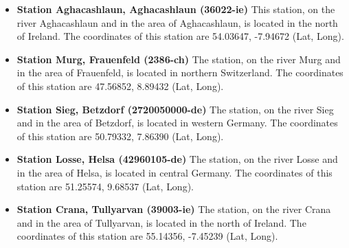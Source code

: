\begin{itemize}
    \item \textbf{Station Aghacashlaun, Aghacashlaun (36022-ie)} \newline
    This station, on the river Aghacashlaun and in the area of Aghacashlaun, is located in the north of Ireland. The coordinates of this station are 54.03647, -7.94672 (\ac{Lat}, \ac{Long}). \cite{StationAghacashlaunAghacashlaun}
    \item \textbf{Station Murg, Frauenfeld (2386-ch)} \newline
    The station, on the river Murg and in the area of Frauenfeld, is located in northern Switzerland. The coordinates of this station are 47.56852, 8.89432 (\ac{Lat}, \ac{Long}). \cite{StationMurgFrauenfeld}
    \item \textbf{Station Sieg, Betzdorf (2720050000-de)} \newline
    The station, on the river Sieg and in the area of Betzdorf, is located in western Germany. The coordinates of this station are 50.79332, 7.86390 (\ac{Lat}, \ac{Long}). \cite{StationSiegBetzdorf}
    \item \textbf{Station Losse, Helsa (42960105-de)} \newline
    The station, on the river Losse and in the area of Helsa, is located in central Germany. The coordinates of this station are 51.25574, 9.68537 (\ac{Lat}, \ac{Long}). \cite{StationLosseHelsa}
    \item \textbf{Station Crana, Tullyarvan (39003-ie)} \newline
    The station, on the river Crana and in the area of Tullyarvan, is located in the north of Ireland. The coordinates of this station are 55.14356, -7.45239 (\ac{Lat}, \ac{Long}). \cite{StationCranaTullyarvan}
    
\end{itemize}


